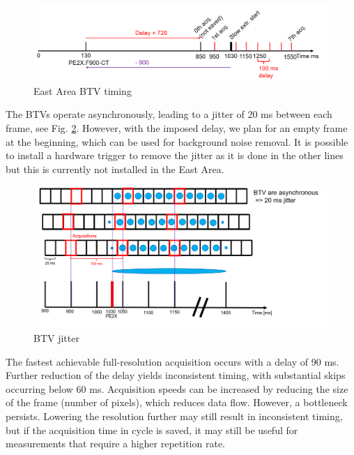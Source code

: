 \begin{figure}[H]
\centering
\includegraphics[width=1.0\linewidth]{03_Empirical_Measurements/images/btv_timing.png}
\caption{East Area BTV timing}
\label{fig:btv_timing}
\end{figure}


The BTVs operate asynchronously, leading to a jitter of 20 ms between each frame, see Fig. \ref{fig:btv_jitter}. However, with the imposed delay, we plan for an empty frame at the beginning, which can be used for background noise removal. It is possible to install a hardware trigger to remove the jitter as it is done in the other lines but this is currently not installed in the East Area.

\begin{figure}[ht]
\centering
\includegraphics[width=1.0\linewidth]{03_Empirical_Measurements/images/btv_jitter.png}
\caption{BTV jitter}
\label{fig:btv_jitter}
\end{figure}

The fastest achievable full-resolution acquisition occurs with a delay of 90 ms. Further reduction of the delay yields inconsistent timing, with substantial skips occurring below 60 ms. Acquisition speeds can be increased by reducing the size of the frame (number of pixels), which reduces data flow. However, a bottleneck persists. Lowering the resolution further may still result in inconsistent timing, but if the acquisition time in cycle is saved, it may still be useful for measurements that require a higher repetition rate.

